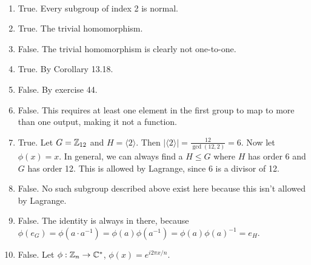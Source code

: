 \documentclass[12pt]{article}
\begin{document}
\begin{problem}[13.32]
~\begin{enumerate}[label=\alph*)]
	\item True. Every subgroup of index 2 is normal.
	\item True. The trivial homomorphism.
	\item False. The trivial homomorphism is clearly not one-to-one.
	\item True. By Corollary 13.18.
	\item False. By exercise 44.
	\item False. This requires at least one element in the first group to map to more than one output, making it not a function.
	\item True. Let $ G= \mathbb{Z}_{12}$ and $ H = \langle 2 \rangle$. Then $ |\langle 2 \rangle|=\frac{12}{ \gcd ( 12,2) } = 6$.  Now let $ \phi(x)=x $. In general, we can always find a $ H \leq G$ where  $ H$ has order 6 and  $ G$ has order 12. This is allowed by Lagrange, since 6 is a divisor of 12.
	\item False. No such subgroup described above exist here because this isn't allowed by Lagrange. 
	\item False. The identity is always in there, because $ \phi(e_G) = \phi(a \cdot a^{-1}) = \phi(a) \phi(a^{-1}) = \phi(a) \phi(a)^{-1} = e_H $.
	\item False. Let $ \phi: \mathbb{Z}_n \to \mathbb{C}^* $, $ \phi(x) = e^{i 2\pi x/n}  $. 
\end{enumerate}
\end{problem}
\end{document}
